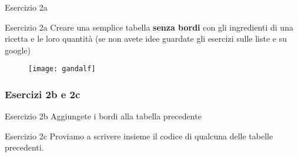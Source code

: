 \begin{frame}[fragile]{Esercizio 2a}

\begin{block}{Esercizio 2a}
	Creare una semplice tabella \textbf{senza bordi} con gli ingredienti di una ricetta
	e le loro quantità (se non avete idee guardate gli esercizi sulle liste e su google)
\end{block}

 \begin{figure}[H]
  \centering
  \texttt{[image: gandalf]}
 \end{figure}

\end{frame}

\begin{frame}
 
\frametitle{Esercizi 2b e 2c}

\begin{block}{Esercizio 2b}
	Aggiungete i bordi alla tabella precedente
\end{block}

\begin{block}{Esercizio 2c}
	Proviamo a scrivere insieme il codice di qualcuna delle tabelle precedenti.
\end{block}

\end{frame}
